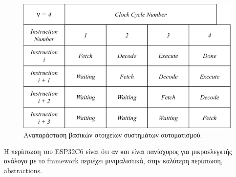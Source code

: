 \begin{figure}[h!]
\centering
\includegraphics[scale=0.4]{images/introduction/pipelining.png}
\caption{Αναπαράσταση βασικών στοιχείων συστημάτων αυτοματισμού.}
 \label{fig:pipelining}
\end{figure}

Η περίπτωση του ESP32C6 είναι ότι αν και είναι πανίσχυρος για μικροελεγκτής ανάλογα
με το framework περιέχει μινιμαλιστικά, στην καλύτερη περίπτωση, abstractions.

